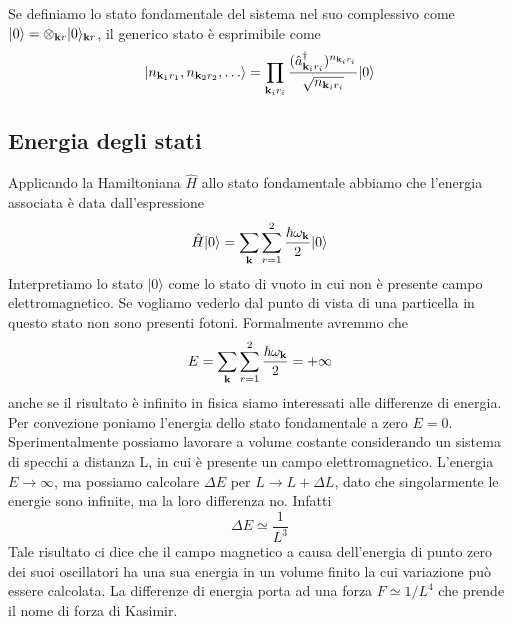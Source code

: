 Se definiamo lo stato fondamentale del sistema nel suo complessivo come $|0 \rangle = \otimes_{\bold{k}r} |0 \rangle_{\bold{k}r}$, il generico stato \`e esprimibile come 
\begin{equation}
	|n_{\bold{k}_1 r_1},n_{\bold{k}_2 r_2},\ldots \rangle = \prod_{\bold{k}_i r_i} \frac{(\hat{a}_{\bold{k}_ir_i}^{\dag})^{n_{\bold{k}_i r_i}}}{\sqrt{n_{\bold{k}_i r_i}}}|0 \rangle 
\end{equation}

\subsection{Energia degli stati}

Applicando la Hamiltoniana $\hat{H}$ allo stato fondamentale abbiamo che l'energia associata \`e data dall'espressione
\begin{equation*}
	\hat{H}|0 \rangle = \sum_{\bold{k}}\sum_{r=1}^2 \frac{\hbar \omega_{\bold{k}}}{2}|0 \rangle 
\end{equation*}
Interpretiamo lo stato $|0 \rangle $ come lo stato di vuoto in cui non \`e presente campo elettromagnetico. Se vogliamo vederlo dal punto di vista di una particella in questo stato non sono presenti fotoni. Formalmente avremmo che 
\begin{equation*}
	E = \sum_{\bold{k}}\sum_{r=1}^2 \frac{\hbar \omega_{\bold{k}}}{2} = + \infty
\end{equation*}
anche se il risultato \`e infinito in fisica siamo interessati alle differenze di energia. Per convezione poniamo l'energia dello stato fondamentale a zero $E = 0$.  Sperimentalmente possiamo lavorare a volume costante considerando un sistema di specchi a distanza L, in cui \`e presente un campo elettromagnetico. L'energia $E \to \infty$, ma possiamo calcolare $\Delta E$ per $L \to L + \Delta L$, dato che singolarmente le energie sono infinite, ma la loro differenza no. Infatti
\begin{equation*}
	\Delta E \simeq \frac{1}{L^3}
\end{equation*}
\newpage
Tale risultato ci dice che il campo magnetico a causa dell'energia di punto zero dei suoi oscillatori  ha una sua energia in un volume finito la cui variazione pu\`o essere calcolata.
La differenze di energia porta ad una forza $F \simeq 1/L^4 $ che prende il nome di forza di Kasimir.


